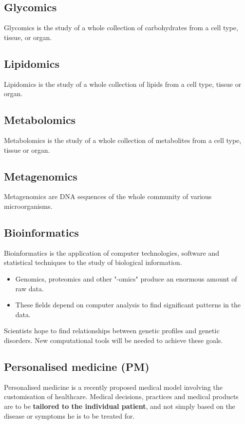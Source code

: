\documentclass[11pt]{article}
\begin{document}
\subsection{Glycomics}
\label{sec:orgb950bb1}
Glycomics is the study of a whole collection of carbohydrates from a cell type, tissue, or organ.

\subsection{Lipidomics}
\label{sec:orgeed2935}
Lipidomics is the study of a whole collection of lipids from a cell type, tissue or organ.

\subsection{Metabolomics}
\label{sec:org1253edc}
Metabolomics is the study of a whole collection of metabolites from a cell type, tissue or organ.

\subsection{Metagenomics}
\label{sec:org131ba37}
Metagenomics are DNA sequences of the whole community of various microorganisms.

\subsection{Bioinformatics}
\label{sec:org6f5fe65}
Bioinformatics is the application of computer technologies, software and statistical techniques to the study of biological information.
\begin{itemize}
\item Genomics, proteomics and other "-omics" produce an enormous amount of raw data.
\item These fields depend on computer analysis to find significant patterns in the data.
\end{itemize}

Scientists hope to find relationships between genetic profiles and genetic disorders. New computational tools will be needed to achieve these goals.

\subsection{Personalised medicine (PM)}
\label{sec:org698e1a6}
Personalised medicine is a recently proposed medical model involving the customisation of healthcare. Medical decisions, practices and medical products are to be \textbf{tailored to the individual patient}, and not simply based on the disease or symptoms he is to be treated for.
\\[0pt]
\end{document}
